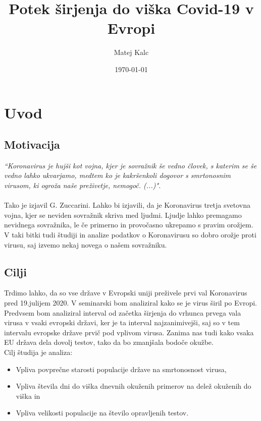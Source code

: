 \documentclass[a4paper,11pt]{article}
\title{Potek širjenja do viška Covid-19 v Evropi}
\author{Matej Kalc} %
\date{\today}
\begin{document}
\maketitle

\section{Uvod}
\subsection{Motivacija}


\emph{“Koronavirus je hujši kot vojna, kjer je sovražnik še vedno človek, s katerim se še
vedno lahko ukvarjamo, medtem ko je kakršenkoli dogovor s smrtonosnim virusom,
ki ogroža naše preživetje, nemogoč. (...)".} \\ \\
Tako je izjavil G. Zuccarini. Lahko bi izjavili, da je Koronavirus tretja svetovna vojna, kjer se neviden sovražnik skriva med ljudmi. Ljudje lahko premagamo nevidnega sovražnika, le če primerno in provočasno ukrepamo s pravim orožjem. V taki bitki tudi študiji in analize podatkov o Koronavirusu so dobro orožje proti virusu, saj izvemo nekaj novega o našem sovražniku.


\subsection{Cilji}
Trdimo lahko, da so vse države v Evropski uniji preživele prvi val Koronavirus pred 19.julijem 2020. V seminarski bom analiziral kako se je virus širil po Evropi. Predvsem bom analiziral interval od začetka širjenja do vrhunca prvega vala virusa v vsaki evropski državi, ker je ta interval najzanimivejši, saj so v tem intervalu evropske države prvič pod vplivom virusa. Zanima nas tudi kako vsaka EU država dela dovolj testov, tako da bo zmanjšala bodoče okužbe. \\
Cilj študija je analiza:
\begin{itemize}
\item{Vpliva povprečne starosti populacije države na smrtonosnost virusa, }
\item{Vpliva števila dni do viška dnevnih okuženih primerov na delež okuženih do viška in }
\item{Vpliva velikosti populacije na število opravljenih testov. }
\end{itemize}
\end{document}
